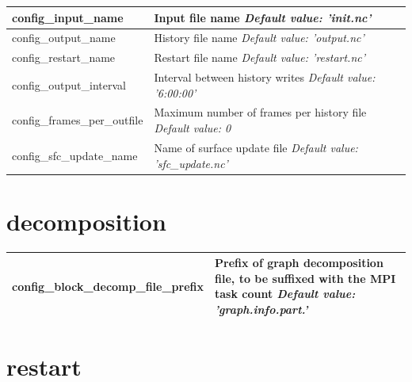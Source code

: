 \documentclass[11pt]{report}
\begin{document}
{\small
\begin{longtable}{|p{2.0in} |p{4.25in}|}
 \hline
   config\_input\_name & Input file name \newline 
   {\em Default value: 'init.nc'} \\ \hline

   config\_output\_name & History file name \newline 
   {\em Default value: 'output.nc'} \\ \hline

   config\_restart\_name & Restart file name \newline 
   {\em Default value: 'restart.nc'} \\ \hline

   config\_output\_interval & Interval between history writes \newline 
   {\em Default value: '6:00:00'} \\ \hline

   config\_frames\_per\_outfile & Maximum number of frames per history file \newline 
   {\em Default value: 0} \\ \hline

   config\_sfc\_update\_name & Name of surface update file \newline 
   {\em Default value: 'sfc\_update.nc'} \\ \hline
\end{longtable}
}

\section{decomposition}

{\small
\begin{longtable}{|p{2.0in} |p{4.25in}|}
 \hline
 
   config\_block\_decomp\_file\_prefix & Prefix of graph decomposition file, to be suffixed with the MPI task count \newline 
   {\em Default value: 'graph.info.part.'} \\ \hline

\end{longtable}
}

\section{restart}
\end{document}
